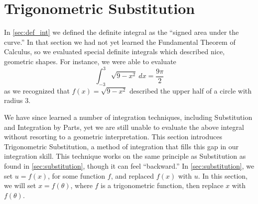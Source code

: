 %


\section{Trigonometric Substitution}\label{sec:trig_sub}

In \autoref{sec:def_int} we defined the definite integral as the ``signed area under the curve.'' In that section we had not yet learned the Fundamental Theorem of Calculus, so we evaluated special definite integrals which described nice, geometric shapes. For instance, we were able to evaluate
\begin{equation}
\int_{-3}^3\sqrt{9-x^2}\ dx = \frac{9\pi}{2}\label{eq:trigsub1}
\end{equation}
 as we recognized that $f(x) = \sqrt{9-x^2}$ described the upper half of a circle with radius 3. 

We have since learned a number of integration techniques, including Substitution and Integration by Parts, yet we are still unable to evaluate the above integral without resorting to a geometric interpretation. This section introduces Trigonometric Substitution, a method of integration that fills this gap in our integration skill. This technique works on the same principle as Substitution as found in \autoref{sec:substitution}, though it can feel ``backward.'' In \autoref{sec:substitution}, we set $u=f(x)$, for some function $f$, and replaced $f(x)$ with $u$. In this section, we will set $x=f(\theta)$, where $f$ is a trigonometric function, then replace $x$ with $f(\theta)$. 

